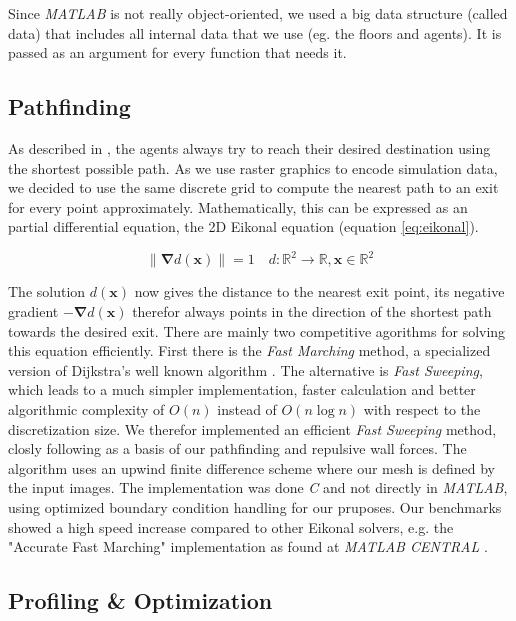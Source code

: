 \documentclass[11pt]{article}
\begin{document}
Since \textit{MATLAB} is not really object-oriented, we used a big data structure (called
data) that includes all internal data that we use (eg. the floors and agents).
It is passed as an argument for every function that needs it.

\subsection{Pathfinding}
As described in \cite{SFMPD}, the agents always try to reach their desired destination using the shortest possible path. As we use raster graphics to encode simulation data, we decided to use the same discrete grid to compute the nearest path to an exit for every point approximately.
Mathematically, this can be expressed as an partial differential equation, the 2D Eikonal equation (equation \ref{eq:eikonal}).

\begin{equation} \label{eq:eikonal}
\|\mathbf{\nabla} d(\mathbf{x})\|=1 \quad d:\!\mathbb{R}^{2}\to\mathbb{R},\mathbf{x}\in\mathbb{R}^{2}
\end{equation}

The solution $d(\mathbf{x})$ now gives the distance to the nearest exit point, its negative gradient $-\mathbf{\nabla}d(\mathbf{x})$ therefor always points in the direction of the shortest path towards the desired exit. There are mainly two competitive agorithms for solving this equation efficiently. First there is the \textit{Fast Marching} method, a specialized version of Dijkstra's well known algorithm \cite{dijkstra59a}. The alternative is \textit{Fast Sweeping}, which leads to a much simpler implementation, faster calculation and better algorithmic complexity of $O(n)$ instead of $O(n\log n)$ with respect to the discretization size. We therefor implemented an efficient \textit{Fast Sweeping} method, closly following \cite{Zhao04afast} as a basis of our pathfinding and repulsive wall forces. The algorithm uses an upwind finite difference scheme where our mesh is defined by the input images. The implementation was done \textit{C} and not directly in \textit{MATLAB}, using optimized boundary condition handling for our pruposes. Our benchmarks showed a high speed increase compared to other Eikonal solvers, e.g. the "Accurate Fast Marching" implementation as found at \textit{MATLAB CENTRAL} \cite{fastmarching}.




\subsection{Profiling \& Optimization}
\end{document}
